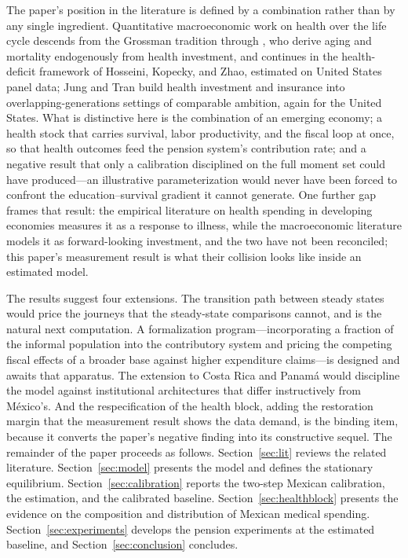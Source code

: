 \documentclass[12pt,a4paper]{article}
\begin{document}
The paper's position in the literature is defined by a combination rather than by any single ingredient. Quantitative macroeconomic work on health over the life cycle descends from the Grossman tradition through \citet{DalgaardStrulik2014}, who derive aging and mortality endogenously from health investment, and continues in the health-deficit framework of Hosseini, Kopecky, and Zhao, estimated on United States panel data; Jung and Tran build health investment and insurance into overlapping-generations settings of comparable ambition, again for the United States. What is distinctive here is the combination of an emerging economy; a health stock that carries survival, labor productivity, and the fiscal loop at once, so that health outcomes feed the pension system's contribution rate; and a negative result that only a calibration disciplined on the full moment set could have produced---an illustrative parameterization would never have been forced to confront the education--survival gradient it cannot generate. One further gap frames that result: the empirical literature on health spending in developing economies measures it as a response to illness, while the macroeconomic literature models it as forward-looking investment, and the two have not been reconciled; this paper's measurement result is what their collision looks like inside an estimated model.

The results suggest four extensions. The transition path between steady states would price the journeys that the steady-state comparisons cannot, and is the natural next computation. A formalization program---incorporating a fraction of the informal population into the contributory system and pricing the competing fiscal effects of a broader base against higher expenditure claims---is designed and awaits that apparatus. The extension to Costa Rica and Panam\'a would discipline the model against institutional architectures that differ instructively from M\'exico's. And the respecification of the health block, adding the restoration margin that the measurement result shows the data demand, is the binding item, because it converts the paper's negative finding into its constructive sequel. The remainder of the paper proceeds as follows. Section~\ref{sec:lit} reviews the related literature. Section~\ref{sec:model} presents the model and defines the stationary equilibrium. Section~\ref{sec:calibration} reports the two-step Mexican calibration, the estimation, and the calibrated baseline. Section~\ref{sec:healthblock} presents the evidence on the composition and distribution of Mexican medical spending.
Section~\ref{sec:experiments} develops the pension experiments at the estimated baseline, and Section~\ref{sec:conclusion} concludes.
\end{document}

